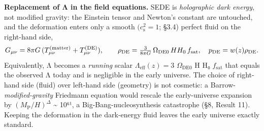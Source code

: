 \documentclass[
  10pt,
]{article}
\begin{document}
\textbf{Replacement of Λ in the field equations.} SEDE is
\emph{holographic dark energy}, not modified gravity: the Einstein
tensor and Newton's constant are untouched, and the deformation enters
only a smooth \((c_{\mathrm{s}}^{2} = 1\); §3.4) perfect fluid on the
right-hand side,
\[G_{\mu\nu} = 8\pi G\,(T^{\rm (matter)}_{\mu\nu} + T^{\rm (DE)}_{\mu\nu}),\qquad
\rho_{\rm DE} = \tfrac{3}{8\pi G}\,\Omega_{\rm DE0}\, H H_0\, f_{\rm sat},\quad p_{\rm DE} = w(z)\rho_{\rm DE}.\]
Equivalently, Λ becomes a \emph{running} scalar
\(\Lambda _{\mathrm{eff}}(z) = 3\) \(\Omega _{\mathrm{DE0}}\) H H₀
\(f_{\mathrm{sat}}\) that equals the observed Λ today and is negligible
in the early universe. The choice of right-hand side (fluid) over
left-hand side (geometry) is not cosmetic: a
Barrow-\emph{modified-gravity} Friedmann equation would rescale the
early-universe expansion by \((M_{\mathrm{P}}/H)^{\Delta }\)
\textasciitilde{} 10⁶¹, a Big-Bang-nucleosynthesis catastrophe (§8,
Result 11). Keeping the deformation in the dark-energy fluid leaves the
early universe exactly standard.
\end{document}
